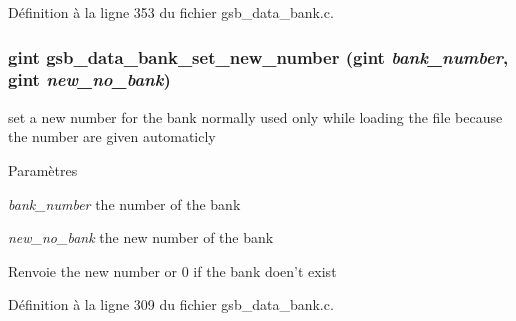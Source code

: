 Définition à la ligne 353 du fichier gsb\_\-data\_\-bank.c.

\subsubsection[{gsb\_\-data\_\-bank\_\-set\_\-new\_\-number}]{\setlength{\rightskip}{0pt plus 5cm}gint gsb\_\-data\_\-bank\_\-set\_\-new\_\-number (gint {\em bank\_\-number}, \/  gint {\em new\_\-no\_\-bank})}\label{gsb__data__bank_8c_a04e6cd7771a2c708cde892d8ff6718a8}
set a new number for the bank normally used only while loading the file because the number are given automaticly


\begin{DoxyParams}{Paramètres}
\item[{\em bank\_\-number}]the number of the bank \item[{\em new\_\-no\_\-bank}]the new number of the bank\end{DoxyParams}
\begin{DoxyReturn}{Renvoie}
the new number or 0 if the bank doen't exist 
\end{DoxyReturn}


Définition à la ligne 309 du fichier gsb\_\-data\_\-bank.c.

